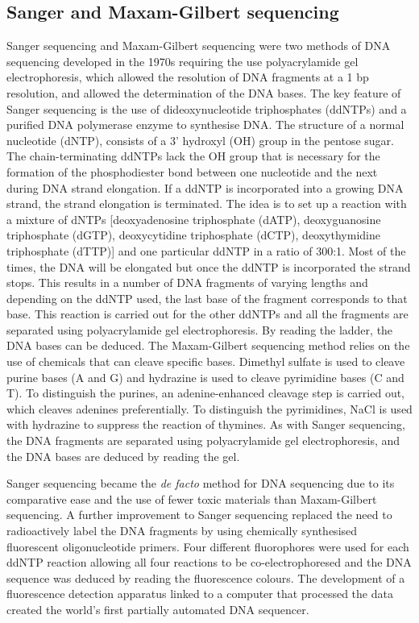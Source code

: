 \subsection{Sanger and Maxam-Gilbert sequencing}

Sanger sequencing\cite{pmid271968} and Maxam-Gilbert sequencing\cite{pmid265521} were two methods of DNA sequencing developed in the 1970s requiring the use polyacrylamide gel electrophoresis, which allowed the resolution of DNA fragments at a 1 bp resolution, and allowed the determination of the DNA bases. The key feature of Sanger sequencing is the use of dideoxynucleotide triphosphates (ddNTPs) and a purified DNA polymerase enzyme to synthesise DNA. The structure of a normal nucleotide (dNTP), consists of a 3' hydroxyl (OH) group in the pentose sugar. The chain-terminating ddNTPs lack the OH group that is necessary for the formation of the phosphodiester bond between one nucleotide and the next during DNA strand elongation. If a ddNTP is incorporated into a growing DNA strand, the strand elongation is terminated. The idea is to set up a reaction with a mixture of dNTPs [deoxyadenosine triphosphate (dATP), deoxyguanosine triphosphate (dGTP), deoxycytidine triphosphate (dCTP), deoxythymidine triphosphate (dTTP)] and one particular ddNTP in a ratio of 300:1. Most of the times, the DNA will be elongated but once the ddNTP is incorporated the strand stops. This results in a number of DNA fragments of varying lengths and depending on the ddNTP used, the last base of the fragment corresponds to that base. This reaction is carried out for the other ddNTPs and all the fragments are separated using polyacrylamide gel electrophoresis. By reading the ladder, the DNA bases can be deduced. The Maxam-Gilbert sequencing method relies on the use of chemicals that can cleave specific bases. Dimethyl sulfate is used to cleave purine bases (A and G) and hydrazine is used to cleave pyrimidine bases (C and T). To distinguish the purines, an adenine-enhanced cleavage step is carried out, which cleaves adenines preferentially. To distinguish the pyrimidines, NaCl is used with hydrazine to suppress the reaction of thymines. As with Sanger sequencing, the DNA fragments are separated using polyacrylamide gel electrophoresis, and the DNA bases are deduced by reading the gel.

Sanger sequencing became the \textit{de facto} method for DNA sequencing due to its comparative ease and the use of fewer toxic materials than Maxam-Gilbert sequencing. A further improvement to Sanger sequencing replaced the need to radioactively label the DNA fragments by using chemically synthesised fluorescent oligonucleotide primers\cite{pmid3713851}. Four different fluorophores were used for each ddNTP reaction allowing all four reactions to be co-electrophoresed and the DNA sequence was deduced by reading the fluorescence colours. The development of a fluorescence detection apparatus linked to a computer that processed the data created the world's first partially automated DNA sequencer\cite{pmid3713851}.

